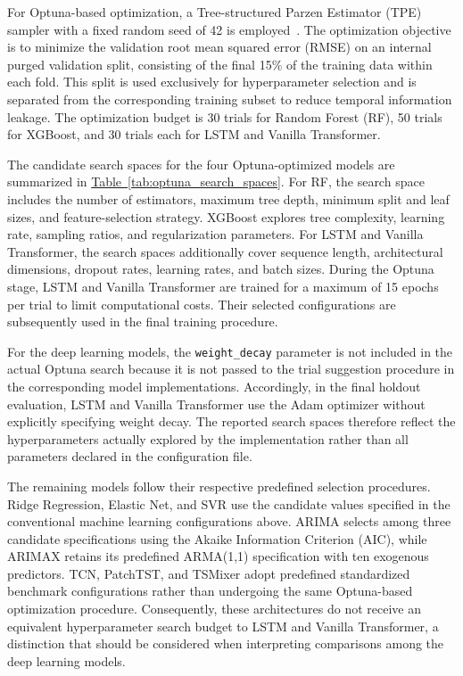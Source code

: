 \documentclass[runningheads,orivec]{llncs}
\begin{document}
For Optuna-based optimization, a Tree-structured Parzen Estimator (TPE) sampler with a fixed random seed of 42 is employed~\cite{akiba2019}. The optimization objective is to minimize the validation root mean squared error (RMSE) on an internal purged validation split, consisting of the final 15\% of the training data within each fold. This split is used exclusively for hyperparameter selection and is separated from the corresponding training subset to reduce temporal information leakage. The optimization budget is 30 trials for Random Forest (RF), 50 trials for XGBoost, and 30 trials each for LSTM and Vanilla Transformer.

The candidate search spaces for the four Optuna-optimized models are summarized in \hyperref[tab:optuna_search_spaces]{Table~\ref*{tab:optuna_search_spaces}}. For RF, the search space includes the number of estimators, maximum tree depth, minimum split and leaf sizes, and feature-selection strategy. XGBoost explores tree complexity, learning rate, sampling ratios, and regularization parameters. For LSTM and Vanilla Transformer, the search spaces additionally cover sequence length, architectural dimensions, dropout rates, learning rates, and batch sizes. During the Optuna stage, LSTM and Vanilla Transformer are trained for a maximum of 15 epochs per trial to limit computational costs. Their selected configurations are subsequently used in the final training procedure.

For the deep learning models, the \texttt{weight\_decay} parameter is not included in the actual Optuna search because it is not passed to the trial suggestion procedure in the corresponding model implementations. Accordingly, in the final holdout evaluation, LSTM and Vanilla Transformer use the Adam optimizer without explicitly specifying weight decay. The reported search spaces therefore reflect the hyperparameters actually explored by the implementation rather than all parameters declared in the configuration file.

The remaining models follow their respective predefined selection procedures. Ridge Regression, Elastic Net, and SVR use the candidate values specified in the conventional machine learning configurations above. ARIMA selects among three candidate specifications using the Akaike Information Criterion (AIC), while ARIMAX retains its predefined ARMA(1,1) specification with ten exogenous predictors. TCN, PatchTST, and TSMixer adopt predefined standardized benchmark configurations rather than undergoing the same Optuna-based optimization procedure. Consequently, these architectures do not receive an equivalent hyperparameter search budget to LSTM and Vanilla Transformer, a distinction that should be considered when interpreting comparisons among the deep learning models.
\end{document}
